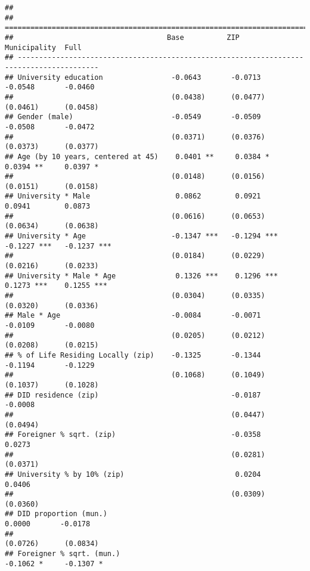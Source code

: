 \documentclass[
]{article}
\begin{document}
\begin{verbatim}
## 
## =========================================================================================
##                                    Base          ZIP           Municipality  Full        
## -----------------------------------------------------------------------------------------
## University education                -0.0643       -0.0713       -0.0548       -0.0460    
##                                     (0.0438)      (0.0477)      (0.0461)      (0.0458)   
## Gender (male)                       -0.0549       -0.0509       -0.0508       -0.0472    
##                                     (0.0371)      (0.0376)      (0.0373)      (0.0377)   
## Age (by 10 years, centered at 45)    0.0401 **     0.0384 *      0.0394 **     0.0397 *  
##                                     (0.0148)      (0.0156)      (0.0151)      (0.0158)   
## University * Male                    0.0862        0.0921        0.0941        0.0873    
##                                     (0.0616)      (0.0653)      (0.0634)      (0.0638)   
## University * Age                    -0.1347 ***   -0.1294 ***   -0.1227 ***   -0.1237 ***
##                                     (0.0184)      (0.0229)      (0.0216)      (0.0233)   
## University * Male * Age              0.1326 ***    0.1296 ***    0.1273 ***    0.1255 ***
##                                     (0.0304)      (0.0335)      (0.0320)      (0.0336)   
## Male * Age                          -0.0084       -0.0071       -0.0109       -0.0080    
##                                     (0.0205)      (0.0212)      (0.0208)      (0.0215)   
## % of Life Residing Locally (zip)    -0.1325       -0.1344       -0.1194       -0.1229    
##                                     (0.1068)      (0.1049)      (0.1037)      (0.1028)   
## DID residence (zip)                               -0.0187                     -0.0008    
##                                                   (0.0447)                    (0.0494)   
## Foreigner % sqrt. (zip)                           -0.0358                      0.0273    
##                                                   (0.0281)                    (0.0371)   
## University % by 10% (zip)                          0.0204                      0.0406    
##                                                   (0.0309)                    (0.0360)   
## DID proportion (mun.)                                            0.0000       -0.0178    
##                                                                 (0.0726)      (0.0834)   
## Foreigner % sqrt. (mun.)                                        -0.1062 *     -0.1307 *  

\end{verbatim}
\end{document}
